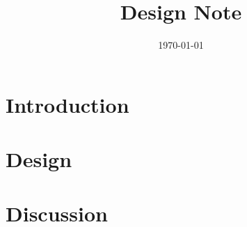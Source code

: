 \documentclass[11pt]{article}
\title{Design Note}
\author{}
\date{\today}
\begin{document}
\maketitle

\section{Introduction}

\section{Design}

\section{Discussion}
\end{document}
